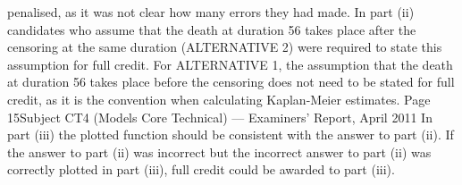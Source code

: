 \documentclass[a4paper,12pt]{article}
\begin{document}
penalised, as it was not clear how many errors they had made.
In part (ii) candidates who assume that the death at duration 56 takes place after the censoring at the same duration (ALTERNATIVE 2) were required to state this assumption for
full credit. For ALTERNATIVE 1, the assumption that the death at duration 56 takes place before the censoring does not need to be stated for full credit, as it is the convention when
calculating Kaplan-Meier estimates.
Page 15Subject CT4 (Models Core Technical) — Examiners’ Report, April 2011
In part (iii) the plotted function should be consistent with the answer to part (ii). If the
answer to part (ii) was incorrect but the incorrect answer to part (ii) was correctly plotted in
part (iii), full credit could be awarded to part (iii).
\end{document}

